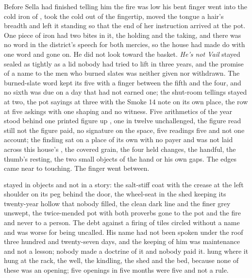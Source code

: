 Before Sella had finished telling him the fire was low his bent finger went into the cold iron of , took the cold out of the fingertip, moved the tongue a hair's breadth and left it standing so that the end of her instruction arrived at the pot. One piece of iron had two bites in it, the holding and the taking, and there was no word in the district's speech for both mercies, so the house had made do with one word and gone on. He did not look toward the basket. \emph{He's not Vail} stayed sealed as tightly as a lid nobody had tried to lift in three years, and the promise of a name to the men who burned slates was neither given nor withdrawn. The burned-slate word kept its five with a finger between the fifth and the four, and no sixth was due on a day that had not earned one; the shut-room tellings stayed at two, the pot sayings at three with the Smoke 14 note on its own place, the row at five askings with one shaping and no witness. Five arithmetics of the year stood behind one printed figure up , one in twelve unchallenged, the figure read still not the figure paid, no signature on the space, five readings five and not one account; the finding sat on a place of its own with no payer and was not laid across this house's , the covered grain, the four held changes, the handful, the thumb's resting, the two small objects of the hand or his own gaps. The edges came near to touching. The finger went between.

 stayed in objects and not in a story: the salt-stiff coat with the crease at the left shoulder on its peg behind the door, the wheel-seat in the shed keeping its twenty-year hollow that nobody filled, the clean dark line and the finer grey unswept, the twice-mended pot with both proverbs gone to the pot and the fire and never to a person. The debt against a firing of tiles circled without a name and was worse for being uncalled. His name had not been spoken under the roof three hundred and twenty-seven days, and the keeping of him was maintenance and not a lesson; nobody made a doctrine of it and nobody paid it.  hung where it hung at the rack, the well, the kindling, the shed and the bed, because none of these was an opening; five openings in five months were five and not a rule.

\scenebreak

